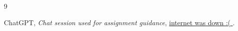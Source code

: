 \documentclass[11pt]{article}
\begin{document}

\maketitle %

\thispagestyle{empty} %

\newpage

\tableofcontents %
\newpage
\listoffigures   %
\newpage







\newpage 
\begin{thebibliography}{9}  %
	
	ChatGPT, \textit{Chat session used for assignment guidance}, 
	\url{internet was down :( }.
	
\end{thebibliography}
 
\end{document}
